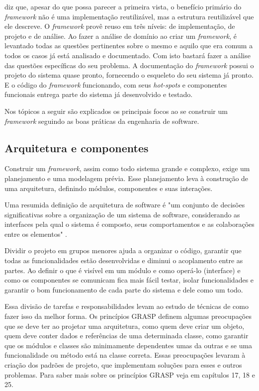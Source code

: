 \cite{Fayad1999} diz que, apesar do que possa parecer a primeira vista, o benefício primário do \textit{framework} não é uma implementação reutilizável, mas a estrutura reutilizável que ele descreve. O \textit{framework} provê reuso em três níveis: de implementação, de projeto e de análise. Ao fazer a análise de domínio ao criar um \textit{framework}, é levantado todas as questões pertinentes sobre o mesmo e aquilo que era comum a todos os casos já está analisado e documentado. Com isto bastará fazer a análise das questões específicas do seu problema. A documentação do \textit{framework} possui o projeto do sistema quase pronto, fornecendo o esqueleto do seu sistema já pronto. E o código do \textit{framework} funcionando, com seus \textit{hot-spots} e componentes funcionais entrega parte do sistema já desenvolvido e testado.

Nos tópicos a seguir são explicados os principais focos ao se construir um \textit{framework} seguindo as boas práticas da engenharia de software.

\subsection{Arquitetura e componentes}

Construir um \textit{framework}, assim como todo sistema grande e complexo, exige um planejamento e uma modelagem prévia. Esse planejamento leva à construção de uma arquitetura, definindo módulos, componentes e suas interações.

Uma resumida definição de arquitetura de software é "um conjunto de decisões significativas sobre a organização de um sistema de software, considerando as interfaces pela qual o sistema é composto, seus comportamentos e as colaborações entre os elementos" \cite{Larman2005}.

Dividir o projeto em grupos menores ajuda a organizar o código, garantir que todas as funcionalidades estão desenvolvidas e diminui o acoplamento entre as partes. Ao definir o que é visível em um módulo e como operá-lo (interface) e como os componentes se comunicam fica mais fácil testar, isolar funcionalidades e garantir o bom funcionamento de cada parte do sistema e dele como um todo.

Essa divisão de tarefas e responsabilidades levam ao estudo de técnicas de como fazer isso da melhor forma. Os princípios GRASP definem algumas preocupações que se deve ter ao projetar uma arquitetura, como quem deve criar um objeto, quem deve conter dados e referências de uma determinada classe, como garantir que os módulos e classes são minimamente dependentes umas da outras e se uma funcionalidade ou método está na classe correta. Essas preocupações levaram à criação dos padrões de projeto, que implementam soluções para esses e outros problemas. Para saber mais sobre os princípios GRASP veja em \cite{Larman2005} capítulos 17, 18 e 25.

